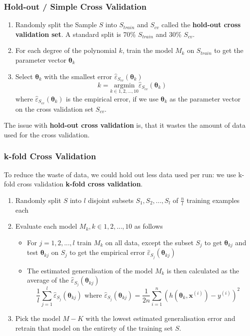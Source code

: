 \documentclass[a4paper, 11pt]{article}
\begin{document}
\subsubsection{Hold-out / Simple Cross Validation}
\begin{enumerate}
	\item Randomly split the Sample $S$ into $S_{train}$ and $S_{cv}$ called the \textbf{hold-out cross validation set}. A standard split is 70\% $S_{train}$ and 30\% $S_{cv}$.
	\item For each degree of the polynomial $k$, train the model $M_k$ on $S_{train}$ to get the parameter vector $\bm{\theta}_k$
	\item Select $\bm{\theta}_k$ with the smallest error $\hat{\varepsilon}_{S_{cv}}(\bm{\theta}_k)$
		\begin{equation*}
			k = \underset{k\in{1,2,...,10}}{\text{argmin}}\hat{\varepsilon}_{S_{cv}}(\bm{\theta}_k)
		\end{equation*}
		where $\hat{\varepsilon}_{S_{cv}}(\bm{\theta}_k)$ is the empirical error, if we use $\bm{\theta}_k$ as the parameter vector on the cross validation set $S_{cv}$.
\end{enumerate}

The issue with \textbf{hold-out cross validation} is, that it wastes the amount of data used for the cross validation.

\subsubsection{k-fold Cross Validation}

To reduce the waste of data, we could hold out less data used per run: we use k-fold cross validation \textbf{k-fold cross validation}.

\begin{enumerate}
	\item Randomly split $S$ into $l$ disjoint subsets $S_1, S_2, ... , S_l$ of $\frac{n}{l}$ training examples each
	\item Evaluate each model $M_k, k\in{1,2, ... , 10}$ as follows
		\begin{itemize}
			\item For $j=1,2,...,l$ train $M_k$ on all data, except the subset $S_j$ to get $\bm{\theta}_{kj}$ and test $\bm{\theta}_{kj}$ on $S_j$ to get the empirical error $\hat{\varepsilon}_{S_j}(\bm{\theta}_{kj})$
			\item The estimated generalisation of the model $M_k$ is then calculated as the average of the $\hat{\varepsilon}_{S_j}(\bm{\theta}_{kj})$
			\begin{equation*}
				\frac{1}{l}\sum_{j=1}^{l}\hat{\varepsilon}_{S_j}(\bm{\theta}_{kj}) \text{ where } \hat{\varepsilon}_{S_j}(\bm{\theta}_{kj})=\frac{1}{2n}\sum_{i=1}^{n}(h(\bm{\theta}_k,\bm{x}^{(i)})-y^{(i)})^2
			\end{equation*}
		\end{itemize}
	\item Pick the model $M-K$ with the lowest estimated generalisation error and retrain that model on the entirety of the training set $S$.
\end{enumerate}
\end{document}
